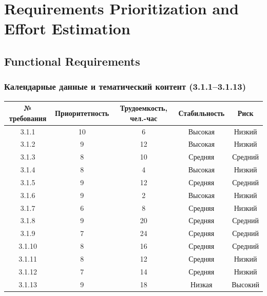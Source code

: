 \section{Requirements Prioritization and Effort Estimation}
\subsection{Functional Requirements}
\subsubsection*{Календарные данные и тематический контент (3.1.1--3.1.13)}
\begin{center}
\renewcommand{\arraystretch}{1.4}
\begin{tabular}{|c|c|c|c|c|}
\hline
№ требования & Приоритетность & Трудоемкость, чел.-час & Стабильность & Риск \\ \hline
3.1.1 & 10 & 6 & Высокая & Низкий \\ \hline
3.1.2 & 9 & 12 & Высокая & Низкий \\ \hline
3.1.3 & 8 & 10 & Средняя & Средний \\ \hline
3.1.4 & 8 & 4 & Высокая & Низкий \\ \hline
3.1.5 & 9 & 12 & Средняя & Средний \\ \hline
3.1.6 & 9 & 2 & Высокая & Низкий \\ \hline
3.1.7 & 6 & 8 & Средняя & Низкий \\ \hline
3.1.8 & 9 & 20 & Средняя & Средний \\ \hline
3.1.9 & 7 & 24 & Средняя & Средний \\ \hline
3.1.10 & 8 & 16 & Средняя & Средний \\ \hline
3.1.11 & 8 & 12 & Средняя & Низкий \\ \hline
3.1.12 & 7 & 14 & Средняя & Низкий \\ \hline
3.1.13 & 9 & 18 & Низкая & Высокий \\ \hline
\end{tabular}
\renewcommand{\arraystretch}{1}
\end{center}

